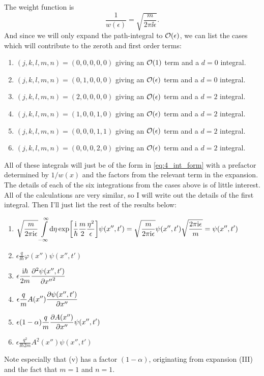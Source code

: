 \documentclass[11pt,letter, swedish, english
]{article}
\begin{document}
The weight function is
\begin{equation}
\frac{1}{w(\epsilon)}=\sqrt{\frac{m}{2\pi\ii\epsilon}}.
\end{equation}
And since we will only expand the path-integral to $\order{\epsilon}$,
we can list the cases which will contribute to the zeroth and first
order terms:
\begin{enumerate}[label=(\roman*)]
\item $(j, k, l, m, n)=(0, 0, 0, 0, 0)$ giving an $\order{1}$ term and a
$d=0$ integral. 
\item $(j, k, l, m, n)=(0, 1, 0, 0, 0)$ giving an $\order{\epsilon}$ term
and a $d=0$ integral. 
\item $(j, k, l, m, n)=(2, 0, 0, 0, 0)$ giving an $\order{\epsilon}$ term
and a $d=2$ integral.
\item $(j, k, l, m, n)=(1, 0, 0, 1, 0)$ giving an $\order{\epsilon}$ term
and a $d=2$ integral.
\item $(j, k, l, m, n)=(0, 0, 0, 1, 1)$ giving an $\order{\epsilon}$ term
and a $d=2$ integral.
\item $(j, k, l, m, n)=(0, 0, 0, 2, 0)$ giving an $\order{\epsilon}$ term
and a $d=2$ integral. 
\end{enumerate}
All of these integrals will just be of the form in
\eqref{eq:4_int_form} with a prefactor determined by $1/w(x)$ and the
factors from the relevant term in the expansion. The details of each
of the six integrations from the cases above is of little
interest. All of the calculations are very similar, so I will write
out the details of the first integral. Then I'll just list the rest of
the results below:
\begin{enumerate}[label=(\roman*)]
\item $\displaystyle
\sqrt{\frac{m}{2\pi\ii\epsilon}} \int_{-\infty}^{\infty}\!\rd{\eta}
\exp[\frac{\ii}{\hbar}\frac{m}{2}\frac{\eta^2}{\epsilon}]
\psi(x'', t')
=\sqrt{\frac{m}{2\pi\ii\epsilon}}\psi(x'', t')
\sqrt{\frac{2\pi\ii\epsilon}{m}}
=\psi(x'', t')
$
\item $\displaystyle
\epsilon\frac{q}{\ii\hbar}\varphi(x'')\psi(x'', t')
$
\item $\displaystyle
\epsilon\frac{\mathrm{i}\hbar}{2m}\pdv[2]{\psi(x'', t')}{{x''}}
$
\item $\displaystyle
\epsilon\frac{q}{m}A(x'')\pdv{\psi(x'', t')}{x''}
$
\item $\displaystyle
\epsilon(1-\alpha)\frac{q}{m}\pdv{A(x'')}{x''}\psi(x'', t')
$
\item $\displaystyle
\epsilon\frac{q^2}{\ii\hbar2m}A^2(x'')\psi(x'', t')
$
\end{enumerate}
Note especially that (v) has a factor $(1-\alpha)$, originating from
expansion (III) and the fact that $m=1$ and $n=1$.
\end{document}
